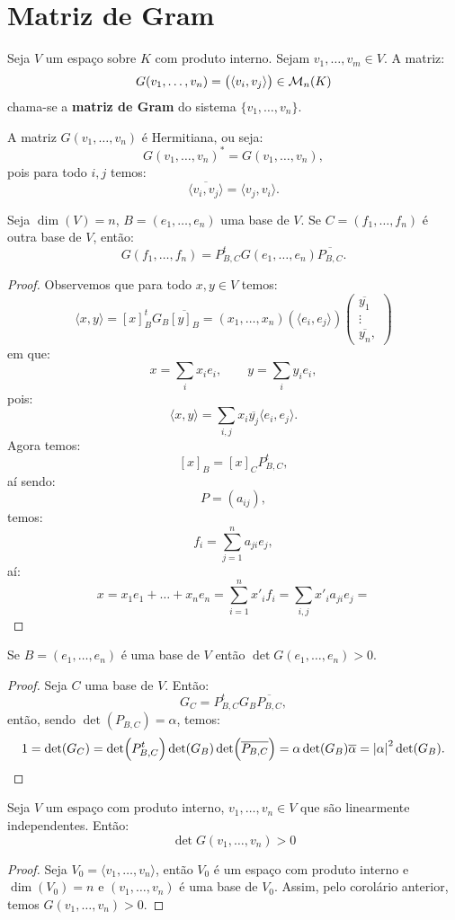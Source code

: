 \documentclass[11pt,twoside,a4paper]{book}
\begin{document}
\section{Matriz de Gram}

\begin{definicao}
Seja $V$ um espaço sobre $K$ com produto interno. Sejam $v_1,\dots,v_m\in V$. A matriz:
\[
G(v_1,\dots,v_n)=\left(\langle v_i,v_j\rangle\right)\in\mathcal{M}_{n}(K)
\]
chama-se a \textbf{matriz de Gram} do sistema $\{v_1,\dots,v_n\}$.
\end{definicao}

\noindent
A matriz $G(v_1,\dots,v_n)$ é Hermitiana, ou seja:
\[
G(v_1,\dots,v_n)^*=G(v_1,\dots,v_n),
\]
pois para todo $i,j$ temos:
\[
\overline{\langle v_i,v_j\rangle}=\langle v_j,v_i\rangle.
\]

\begin{proposicao}
Seja $\dim(V)=n$, $B=(e_1,\dots,e_n)$ uma base de $V$. Se $C=(f_1,\dots,f_n)$ é outra base de $V$, então:
\[
G(f_1,\dots,f_n)=P^t_{B,C}G(e_1,\dots,e_n)\overline{P_{B,C}}.
\]
\end{proposicao}
\begin{proof}
Observemos que para todo $x,y\in V$ temos:
\[
\langle x,y\rangle=[x]^t_BG_B\overline{[y]_B}=(x_1,\dots,x_n)\left(\langle e_i,e_j\rangle\right)\begin{pmatrix}
\overline{y_1}\\\vdots\\\overline{y_n},
\end{pmatrix}
\]
em que:
\[
x=\sum_i x_ie_i,\quad\quad y=\sum_i y_ie_i,
\]
pois:
\[
\langle x,y\rangle=\sum_{i,j}x_i\overline{y_j}\langle e_i,e_j\rangle.
\]
Agora temos:
\[
[x]_B=[x]_CP_{B,C}^t,
\]
aí sendo:
\[
P=(a_{ij}),
\]
temos:
\[
f_i=\sum_{j=1}^na_{ji}e_j,
\]
aí:
\[
x=x_1e_1+\dots+x_ne_n=\sum_{i=1}^nx'_if_i=\sum_{i,j}x'_ia_{ji}e_j=
\]
\end{proof}

\begin{corolario}
Se $B=(e_1,\dots,e_n)$ é uma base de $V$ então $\det G(e_1,\dots,e_n)>0$.
\end{corolario}
\begin{proof}
Seja $C$ uma base de $V$. Então:
\[
G_C=P^t_{B,C}G_B\overline{P_{B,C}},
\]
então, sendo $\det(P_{B,C})=\alpha$, temos:
\[
1=\det(G_C)=\det(P^t_{B,C})\det(G_B)\det(\overline{P_{B,C}})=\alpha\det(G_B)\overline{\alpha}=\abs{\alpha}^2\det(G_B).
\]
\end{proof}

\begin{corolario}
Seja $V$ um espaço com produto interno, $v_1,\dots,v_n\in V$ que são linearmente independentes. Então:
\[
\det G(v_1,\dots,v_n)>0
\]
\end{corolario}
\begin{proof}
Seja $V_0=\langle v_1,\dots,v_n\rangle$, então $V_0$ é um espaço com produto interno e $\dim(V_0)=n$ e $(v_1,\dots,v_n)$ é uma base de $V_0$. Assim, pelo corolário anterior, temos $G(v_1,\dots,v_n)>0$.
\end{proof}
\end{document}
